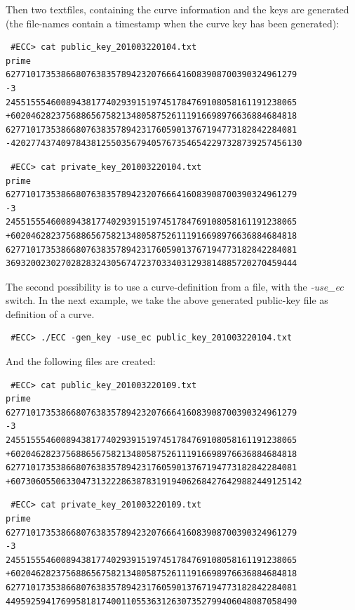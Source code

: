 \documentclass[11pt,english]{article}
\begin{document}
Then two textfiles, containing the curve information and the keys are generated (the file-names contain a timestamp when the curve key has been generated):

\begin{verbatim}
 #ECC> cat public_key_201003220104.txt
prime
6277101735386680763835789423207666416083908700390324961279
-3
2455155546008943817740293915197451784769108058161191238065
+602046282375688656758213480587526111916698976636884684818
6277101735386680763835789423176059013767194773182842284081
-4202774374097843812550356794057673546542297328739257456130
\end{verbatim}

\begin{verbatim}
 #ECC> cat private_key_201003220104.txt
prime
6277101735386680763835789423207666416083908700390324961279
-3
2455155546008943817740293915197451784769108058161191238065
+602046282375688656758213480587526111916698976636884684818
6277101735386680763835789423176059013767194773182842284081
3693200230270282832430567472370334031293814885720270459444
\end{verbatim}

The second possibility is to use a curve-definition from a file, with the \emph{-use\_ec} switch. In the next example, we take the above generated public-key file as definition of a curve.

\begin{verbatim}
 #ECC> ./ECC -gen_key -use_ec public_key_201003220104.txt
\end{verbatim}

And the following files are created:

\begin{verbatim}
 #ECC> cat public_key_201003220109.txt
prime
6277101735386680763835789423207666416083908700390324961279
-3
2455155546008943817740293915197451784769108058161191238065
+602046282375688656758213480587526111916698976636884684818
6277101735386680763835789423176059013767194773182842284081
+6073060550633047313222863878319194062684276429882449125142
\end{verbatim}
\begin{verbatim}
 #ECC> cat private_key_201003220109.txt
prime
6277101735386680763835789423207666416083908700390324961279
-3
2455155546008943817740293915197451784769108058161191238065
+602046282375688656758213480587526111916698976636884684818
6277101735386680763835789423176059013767194773182842284081
4495925941769958181740011055363126307352799406048087058490
\end{verbatim}
\end{document}
